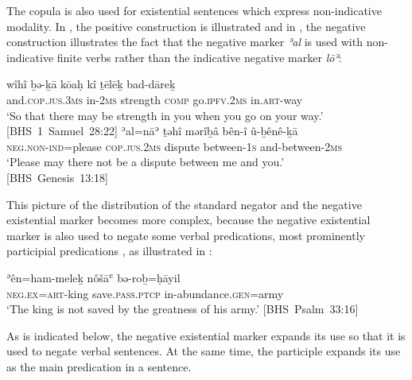 ﻿\documentclass[output=paper]{langsci/langscibook}
\begin{document}
%
The copula is also used for existential sentences which express
non-indicative modality. In , the positive
construction is illustrated and in , the negative construction illustrates the fact that the negative marker \textit{ʾal}  is used with non-indicative finite verbs rather than the indicative negative marker \textit{lōʾ}:
%
\begin{exe}\ex\begin{xlist}
\ex\label{ex:heb-strength}
\gll wîhî ḇə-ḵā kōaḥ kî ṯēlēḵ bad-dāreḵ\\
and.\textsc{cop.jus.3ms} in-\textsc{2ms} strength \textsc{comp}
go.\textsc{ipfv.2ms} in.\textsc{art}{}-way\\
\glt `So that there may be strength in you when you go on your
way.' \\\mbox{[BHS 1 Samuel 28:22]}
%
\ex\label{ex:heb-dispute}
\gll ʾal=nāʾ ṯəhî mərîḇâ bên-î û-ḇênê-ḵā \\
\textsc{neg.non-ind}=please  \textsc{cop.jus.2ms} dispute between-\textsc{1s}
and-between-\textsc{2ms}\\
\glt `Please may there not be a dispute between me and you.'\\
\mbox{[BHS Genesis 13:18]}
\end{xlist}\end{exe}
%
This picture of the distribution of the standard negator and the negative
existential marker becomes more complex, because the negative existential
marker is also used to negate some verbal predications, most prominently
participial predications \parencite[see][]{MillerNaude2015}, as illustrated
in :
%
\begin{exe}\ex\label{ex:heb-king-not-saved}
    \gll ʾên=ham-meleḵ nôšāʿ bə-roḇ=ḥāyil\\
  \textsc{neg.ex}=\textsc{art}-king save.\textsc{pass.ptcp}\footnotemark{} %
 in-abundance.\textsc{gen}=army \\
    \glt  `The king is not saved by the greatness of his army.'
    \mbox{[BHS Psalm 33:16]}
    \end{exe}
As is indicated below, the negative existential marker expands its use so
that it is used to negate verbal sentences. At the same time, the
participle expands its use as the main predication in a sentence.
\end{document}
